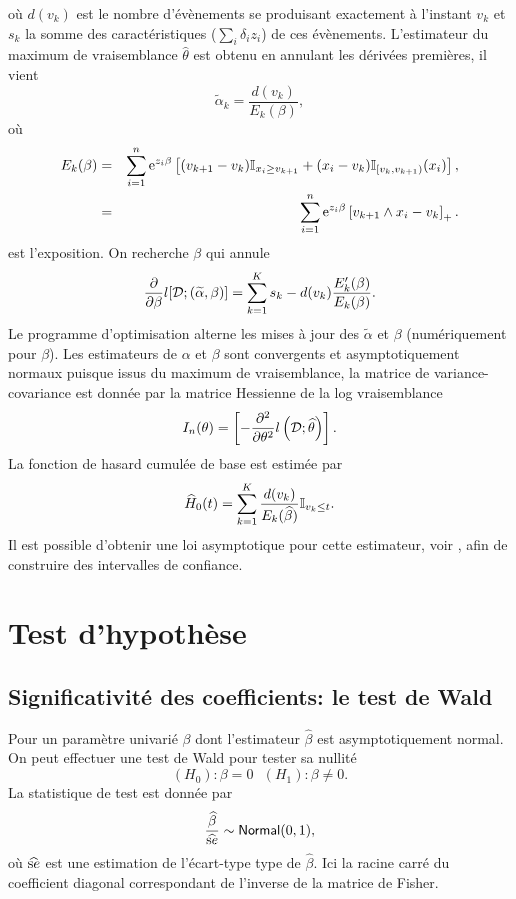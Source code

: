 où $d(v_k)$ est le nombre d'évènements se produisant exactement à l'instant $v_k$ et $s_k$ la somme des caractéristiques ($\sum_i \delta_i z_i$) de ces évènements. L'estimateur du maximum de vraisemblance $\widehat{\theta}$ est obtenu en annulant les dérivées premières, il vient 
$$
\widetilde{\alpha}_k = \frac{d(v_k)}{E_k(\beta)}, 
$$
où 
\begin{eqnarray*}
E_k(\beta) &=& \sum_{i=1}^{n}\mathrm{e}^{z_i\beta}\left[(v_{k+1} - v_{k})\mathbb{I}_{x_i\geq v_{k+1}} +(x_i - v_{k})\mathbb{I}_{[v_{k}, v_{k+1})}(x_i)\right],\\
&=& \sum_{i=1}^{n}\mathrm{e}^{z_i\beta}\left[v_{k+1}\land x_i - v_{k}\right]_+.
\end{eqnarray*}
est l'exposition.
On recherche $\beta$ qui annule
$$
\frac{\partial}{\partial \beta}l[\mathcal{D}; (\widetilde{\alpha},\beta) ] = \sum_{k=1}^K s_k - d(v_k)\frac{E_k'(\beta)}{E_k(\beta)}.
$$
Le programme d'optimisation alterne les mises à jour des $\tilde{\alpha}$ et $\beta$ (numériquement pour $\beta$). Les estimateurs de $\alpha$ et $\beta$ sont convergents et asymptotiquement normaux puisque issus du maximum de vraisemblance, la matrice de variance-covariance est donnée par la matrice Hessienne de la log vraisemblance
$$
I_n(\theta) = \left[-\frac{\partial^2}{\partial\theta^2}l\left(\mathcal{D};\widehat{\theta}\right)\right].
$$ La fonction de hasard cumulée de base est estimée par 
$$
\widehat{H}_0(t) = \sum_{k=1}^K\frac{d(v_k)}{E_k(\widehat{\beta})}\mathbb{I}_{v_k\leq t}.
$$
Il est possible d'obtenir une loi asymptotique pour cette estimateur, voir \citet{Spiekerman1998}, afin de construire des intervalles de confiance.
\section{Test d'hypothèse}
\subsection{Significativité des coefficients: le test de Wald}
Pour un paramètre univarié $\beta$ dont l'estimateur $\widehat{\beta}$ est asymptotiquement normal. On peut effectuer une test de Wald pour tester sa nullité
$$
(H_0): \beta =0\text{  }(H_1):\beta\neq 0.
$$
La statistique de test est donnée par
$$
\frac{\widehat{\beta}}{\widehat{\text se}}\sim\mathsf{Normal}(0,1),
$$ 
où $\widehat{\text se}$ est une estimation de l'écart-type type de $\widehat{\beta}.$ Ici la racine carré du coefficient diagonal correspondant de l'inverse de la matrice de Fisher.
